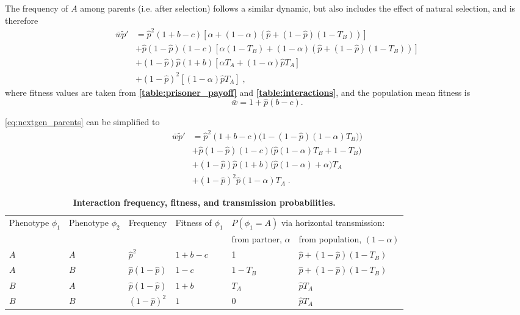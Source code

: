\documentclass[12pt]{extarticle}
\begin{document}
The frequency of $A$ among parents (i.e. after selection) follows a similar dynamic, but also includes the effect of natural selection, and is therefore
\begin{equation}\label{eq:nextgen_parents}
\begin{aligned}
\bar{w} \tilde{p}'
& = \hat{p}^2 (1+b-c) [\alpha + (1-\alpha)(\hat{p} + (1-\hat{p})(1-T_B))] \\
& + \hat{p}(1-\hat{p}) (1-c) [\alpha(1-T_B) + (1-\alpha)(\hat{p} + (1-\hat{p})(1-T_B))] \\
& + (1-\hat{p})\hat{p} (1+b) [\alpha T_A + (1-\alpha) \hat{p} T_A ] \\
& + (1-\hat{p})^2 [(1-\alpha) \hat{p} T_A] \;,
\end{aligned}
\end{equation}
where fitness values are taken from \textbf{\autoref{table:prisoner_payoff}} and \textbf{\autoref{table:interactions}}, and the population mean fitness is
\begin{equation} \label{eq:mean_fitness}
\bar{w} =  1 + \hat{p}(b-c).
\end{equation}

\autoref{eq:nextgen_parents} can be simplified to
\begin{equation}\label{eq:nextgen_parents_simplified}
\begin{aligned}
\bar{w} \tilde{p}'
& = \hat{p}^2 (1+b-c) \big(1-(1-\hat{p})(1-\alpha)T_B)\big) \\
& + \hat{p}(1-\hat{p}) (1-c) \big(\hat{p}(1-\alpha)T_B+1-T_B\big) \\
& + (1-\hat{p})\hat{p} (1+b) \big(\hat{p}(1-\alpha) + \alpha\big) T_A \\
& + (1-\hat{p})^2 \hat{p} (1-\alpha) T_A \;.
\end{aligned}
\end{equation}

\begin{table}[]
\begin{tabular}{@{}llllll@{}}
\toprule
\multirow{2}{*}{Phenotype $\phi_1$} &
  \multirow{2}{*}{Phenotype $\phi_2$} &
  \multirow{2}{*}{Frequency} &
  \multirow{2}{*}{Fitness of $\phi_1$} &
  \multicolumn{2}{l}{$P(\phi_1=A)$ via horizontal transmission:} \\ \cmidrule(l){5-6} 
    &     &                      &         & from partner, $\alpha$ & from population, $(1-\alpha)$ \\ \cmidrule(r){1-6}
$A$ & $A$ & $\hat{p}^2$          & $1+b-c$ & 1                      & $\hat{p}+(1-\hat{p})(1-T_B)$  \\
$A$ & $B$ & $\hat{p}(1-\hat{p})$ & $1-c$   & $1-T_B$                & $\hat{p}+(1-\hat{p})(1-T_B)$  \\
$B$ & $A$ & $\hat{p}(1-\hat{p})$ & $1+b$   & $T_A$                  & $\hat{p} T_A$                 \\
$B$ & $B$ & $(1-\hat{p})^2$      & $1$     & $0$                    & $\hat{p} T_A$                 \\ \bottomrule
\end{tabular}
\caption{\textbf{Interaction frequency, fitness, and transmission probabilities.}}
\label{table:interactions}
\end{table}
\end{document}
